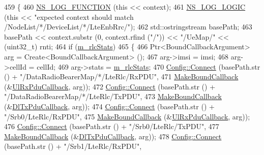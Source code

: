 \begin{DoxyCode}
459 \{
460   \hyperlink{log-macros-disabled_8h_a90b90d5bad1f39cb1b64923ea94c0761}{NS\_LOG\_FUNCTION} (\textcolor{keyword}{this} << context);
461   \hyperlink{group__logging_ga88acd260151caf2db9c0fc84997f45ce}{NS\_LOG\_LOGIC} (\textcolor{keyword}{this} << \textcolor{stringliteral}{"expected context  should match /NodeList/*/DeviceList/*/LteEnbRrc/"});
462   std::ostringstream basePath;
463   basePath <<  context.substr (0, context.rfind (\textcolor{stringliteral}{"/"})) << \textcolor{stringliteral}{"/UeMap/"} << (uint32\_t) rnti;
464   \textcolor{keywordflow}{if} (\hyperlink{classns3_1_1RadioBearerStatsConnector_a25b5370b25e598c40f5d40d845ca072b}{m\_rlcStats})
465     \{
466       Ptr<BoundCallbackArgument> arg = Create<BoundCallbackArgument> ();
467       arg->imsi = imsi;
468       arg->cellId = cellId; 
469       arg->stats = \hyperlink{classns3_1_1RadioBearerStatsConnector_a25b5370b25e598c40f5d40d845ca072b}{m\_rlcStats};
470       \hyperlink{group__config_ga4014f151241cd0939b6cb64409605736}{Config::Connect} (basePath.str () + \textcolor{stringliteral}{"/DataRadioBearerMap/*/LteRlc/RxPDU"},
471                        \hyperlink{group__makeboundcallback_ga1725d6362e6065faa0709f7c93f8d770}{MakeBoundCallback} (&\hyperlink{namespacens3_a269527c03607c9c885d7cff7667ec5e0}{UlRxPduCallback}, arg));
472       \hyperlink{group__config_ga4014f151241cd0939b6cb64409605736}{Config::Connect} (basePath.str () + \textcolor{stringliteral}{"/DataRadioBearerMap/*/LteRlc/TxPDU"},
473                        \hyperlink{group__makeboundcallback_ga1725d6362e6065faa0709f7c93f8d770}{MakeBoundCallback} (&\hyperlink{namespacens3_a7de82f7ed9986b9bcb67951f61e02ff4}{DlTxPduCallback}, arg));
474       \hyperlink{group__config_ga4014f151241cd0939b6cb64409605736}{Config::Connect} (basePath.str () + \textcolor{stringliteral}{"/Srb0/LteRlc/RxPDU"},
475                        \hyperlink{group__makeboundcallback_ga1725d6362e6065faa0709f7c93f8d770}{MakeBoundCallback} (&\hyperlink{namespacens3_a269527c03607c9c885d7cff7667ec5e0}{UlRxPduCallback}, arg));
476       \hyperlink{group__config_ga4014f151241cd0939b6cb64409605736}{Config::Connect} (basePath.str () + \textcolor{stringliteral}{"/Srb0/LteRlc/TxPDU"},
477                        \hyperlink{group__makeboundcallback_ga1725d6362e6065faa0709f7c93f8d770}{MakeBoundCallback} (&\hyperlink{namespacens3_a7de82f7ed9986b9bcb67951f61e02ff4}{DlTxPduCallback}, arg));
478       \hyperlink{group__config_ga4014f151241cd0939b6cb64409605736}{Config::Connect} (basePath.str () + \textcolor{stringliteral}{"/Srb1/LteRlc/RxPDU"},

\end{DoxyCode}
